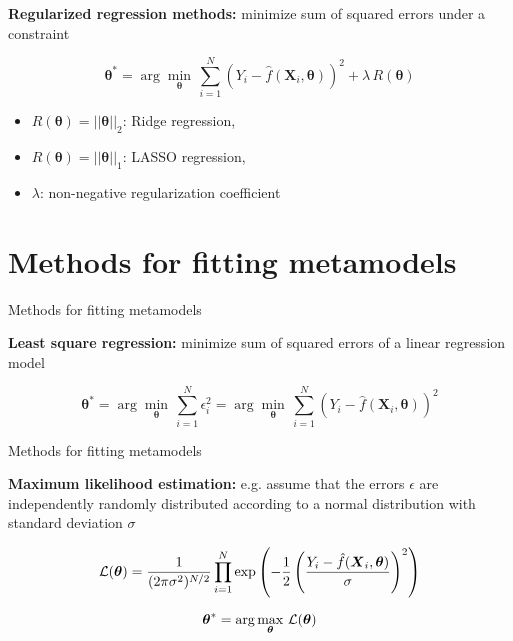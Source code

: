 \documentclass{beamer}
\begin{document}
\begin{frame}

{\bf Regularized regression methods:} minimize sum of squared errors under a constraint

\[
\boldsymbol{\theta}^* = \arg \min_{\boldsymbol{\theta}} \, \sum_{i=1}^N (Y_i - \hat{f}(\boldsymbol{X}_i, \boldsymbol{\theta}))^2 + \lambda \, R(\boldsymbol{\theta})
\]

\begin{itemize}
\item $R(\boldsymbol{\theta}) = ||\boldsymbol{\theta}||_2$: Ridge regression,
\item $R(\boldsymbol{\theta}) = ||\boldsymbol{\theta}||_1$: LASSO regression,
\item $\lambda$: non-negative regularization coefficient
\end{itemize}

\end{frame}
  

\section{Methods for fitting metamodels}
\begin{frame}[t]{Methods for fitting metamodels}

{\bf Least square regression:} minimize sum of squared errors of a linear regression model

\[
\boldsymbol{\theta}^* = \arg \min_{\boldsymbol{\theta}} \, \sum_{i=1}^N \epsilon_i^2 =\arg \min_{\boldsymbol{\theta}} \, \sum_{i=1}^N (Y_i - \hat{f}(\boldsymbol{X}_i, \boldsymbol{\theta}))^2
\]

\end{frame}


\begin{frame}[t]{Methods for fitting metamodels}

{\bf Maximum likelihood estimation:} e.g. assume that the errors $\epsilon$ are independently randomly distributed according to a normal distribution with standard deviation $\sigma$

\[
\mathcal{L}(\boldsymbol{\theta}) = \frac{1}{ (2 \pi \sigma^2)^{N/2}} \prod_{i=1}^N \exp\left( - \frac{1}{2} \left( \frac{Y_i - \hat{f}(\boldsymbol{X}_i, \boldsymbol{\theta}) }{\sigma} \right) ^2 \right)
\]

\[
\boldsymbol{\theta}^* = \arg \max_{\boldsymbol{\theta}} \, \mathcal{L}(\boldsymbol{\theta})
\]
  
\end{frame}
\end{document}
